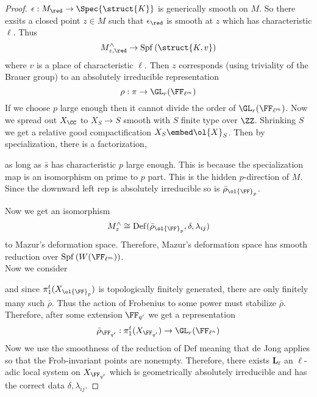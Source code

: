 \documentclass{article}
\newcommand{\LL}{\mathbf{L}}
\newcommand{\Def}{\mathrm{Def}}
\newcommand{\Spf}[1]{\mathrm{Spf}\left( #1 \right)}
\begin{document}
\begin{proof}
$\epsilon : M_\red \to \Spec{\struct{K}}$ is generically smooth on $M$. So there exsits a closed point $z \in M$ such that $\epsilon_{\red}$ is smooth at $z$ which has characteristic $\ell$. Thus
\[ M_{z,\red}^{\wedge} \to \Spf{\struct{K,v}} \]
where $v$ is a place of characteristic $\ell$. Then $z$ corresponds (using triviality of the Brauer group) to an absolutely irreducible representation
\[ \rho : \pi \to \GL_r(\FF_{\ell^m}) \]
If we choose $p$ large enough then it cannot divide the order of $\GL_r(\FF_{\ell^m})$. Now we spread out $X_{\CC}$ to $X_S \to S$ smooth with $S$ finite type over $\ZZ$. Shrinking $S$ we get a relative good compactification $X_S \embed \ol{X}_S$. Then by specialization, there is a factorization,
\begin{center}
\end{center} 
as long as $\bar{s}$ has characteristic $p$ large enough. This is because the specialization map is an isomorphism on prime to $p$ part. This is the hidden $p$-direction of $M$. Since the downward left rep is absolutely irreducible so is $\bar{\rho}_{\ol{\FF}_p}$. 
\par 
Now we get an isomorphism
\[ M_{z}^{\wedge} \cong \Def(\bar{\rho}_{\ol{\FF}_p}, \delta, \lambda_{ij}) \]
to Mazur's deformation space. Therefore, Mazur's deformation space has smooth reduction over $\Spf{W(\FF_{\ell^m})}$. 
\bigskip\\
Now we consider
\begin{center}
\end{center}
and since $\pi_1^t(X_{\ol{\FF}_p})$ is topologically finitely generated, there are only finitely many such $\bar{\rho}$. Thus the action of Frobenius to some power must stabilize $\bar{\rho}$. Therefore, after some extension $\FF_{q'}$ we get a representation
\[ \bar{\rho}_{\FF_{q'}} : \pi_1^t(X_{\FF_{q'}}) \to \GL_r(\FF_{\ell^n}) \]
Now we use the smoothness of the reduction of $\Def$ meaning that de Jong applies so that the Frob-invariant points are nonempty. Therefore, there exists $\LL_\ell$ an $\ell$-adic local system on $X_{\FF_{q'}}$ which is geometrically absolutely irreducible and has the correct data $\delta, \lambda_{ij}$. 

\end{proof}
\end{document}
